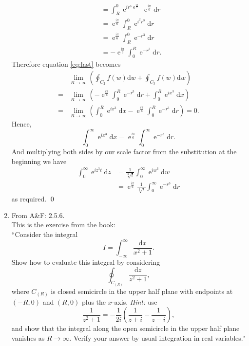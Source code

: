 \documentclass[10pt]{amsart}
\newcommand{\D}{\mathrm{d}}
\DeclareMathOperator{\E}{e}
\theoremstyle{nonumberplain}
\begin{document}
\begin{enumerate}[label={\bf {\arabic*}:}]
\begin{align*}
	&= \int_{R}^{0} \E^{ir^3\E^{\frac{i\pi}{2}}} \E^{\frac{i\pi}{6}} \D r \\
	&= \E^{\frac{i\pi}{6}} \int_{R}^{0} \E^{i^2r^3} \D r \\
	&= \E^{\frac{i\pi}{6}} \int_{R}^{0} \E^{-r^3} \D r \\
	&= - \E^{\frac{i\pi}{6}} \int_{0}^{R} \E^{-r^3} \D r.
\end{align*}
Therefore equation \eqref{eq:last} becomes
\begin{align*}
& \lim_{R\rightarrow\infty} \left(
	\oint_{C_{2}} f(w) \D w + \oint_{C_{3}} f(w) \D w
\right) \\
	= & \lim_{R\rightarrow\infty}  \left(
	- \E^{\frac{i\pi}{6}} \int_{0}^{R} \E^{-r^3} \D r + \int_{0}^{R} \E^{ix^3} \D x
\right) \\
= & \lim_{R\rightarrow\infty}  \left(
	\int_{0}^{R} \E^{ix^3} \D x
	- \E^{\frac{i\pi}{6}} \int_{0}^{R} \E^{-r^3} \D r 
\right) = 0.
\end{align*}
Hence,
$$
\int_{0}^{\infty} \E^{ix^3} \D x =  \E^{\frac{i\pi}{6}} \int_{0}^{\infty} \E^{-r^3} \D r.
$$
And multiplying both sides by our scale factor from the substitution at the beginning we have
\begin{align*}
\int_{0}^{\infty} \E^{iz^3t} \D z &= \frac{1} {\sqrt[3]{t}} \int_{0}^{\infty} \E^{iw^3} \D w \\
	&=  \E^{\frac{i\pi}{6}} \frac{1} {\sqrt[3]{t}}  \int_{0}^{\infty} \E^{-r^3} \D r
\end{align*}
as required.
\qed
\\

\item From A\&F: 2.5.6. \\
This is the exercise from the book: \\
``Consider the integral $$I = \int_{-\infty}^{\infty} \frac{\D x}{x^2 + 1}.$$
Show how to evaluate this integral by considering
$$\oint_{C_{(R)}} \frac{\D z}{z^2 + 1},$$
where $C_{(R)}$ is closed semicircle in the upper half plane with endpoints at $(-R, 0)$ and $(R, 0)$ plus the $x$-axis.
\textit{Hint:} use
$$\frac{1}{z^2 + 1} = -\frac{1}{2i}\left(\frac{1}{z + i} - \frac{1}{z - i}\right),$$
and show that the integral along the open semicircle in the upper half plane vanishes as $R \rightarrow \infty$.
Verify your answer by usual integration in real variables." \\


\end{enumerate}
\end{document}
